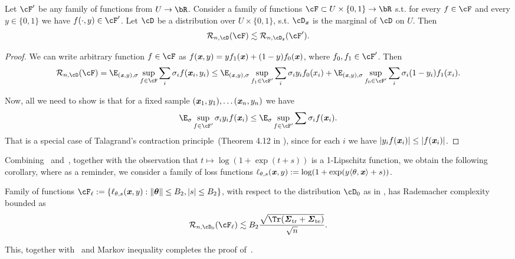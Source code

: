 \begin{lemma}
    \label{lem:rademacher-y}
    Let $\cF'$ be any family of functions from $U \to \bR$. Consider a family of functions $\cF \subset U \times \{0, 1\} \to \bR$ s.t. for every $f \in \cF$ and every $y \in \{0, 1\}$ we have $f(\cdot, y) \in \cF'$. 
    Let $\cD$ be a distribution over $U \times \{ 0, 1\}$, s.t. $\cD_{\xx}$ is the marginal of $\cD$ on $U$. Then
    \begin{equation*}
        \mathcal{R}_{n, \cD}(\cF) \lesssim \mathcal{R}_{n, \cD_{\xx}}(\cF').
    \end{equation*}
\end{lemma}
\begin{proof}
    We can write arbitrary function $f \in \cF$ as  $f(\boldsymbol{\mathit{x}}, y) = y f_1(\boldsymbol{\mathit{x}}) + (1-y) f_0(\boldsymbol{\mathit{x}})$, 
    where $f_0, f_1 \in \cF'$. Then
    \begin{equation*}
        \mathcal{R}_{n, \cD}(\cF) = \E_{(\xx, y), \sigma} \sup_{f \in \cF} \sum_i \sigma_i f(\xx_i, y_i) \leq \E_{(\xx, y), \sigma} \sup_{f_1 \in \cF'} \sum_i \sigma_i y_i f_0(x_i) + \E_{(\xx, y), \sigma}\sup_{f_0 \in \cF'} \sum_i \sigma_i (1-y_i) f_1(x_i).
    \end{equation*}

    Now, all we need to show is that for a fixed sample $(\boldsymbol{\mathit{x}}_1, y_1), \ldots (\boldsymbol{\mathit{x}}_n, y_n)$ we have
    \begin{equation*}
        \E_{\sigma} \sup_{f \in \cF'} \sigma_i y_i f(\xx_i) \leq \E_{\sigma} \sup_{f \in \cF'} \sum \sigma_i f(\xx_i).
    \end{equation*}
    That is a special case of Talagrand's contraction principle~(Theorem 4.12 in \cite{ledoux2013probability}), since for each $i$ we have $|y_i f(\boldsymbol{\mathit{x}}_i)| \leq |f(\boldsymbol{\mathit{x}}_i)|$.
\end{proof}
Combining~ and~, together with the observation that $t \mapsto \log(1 + \exp(t + s))$ is a 1-Lipschitz function, we obtain the following corollary, where as a reminder, we consider a family of loss functions $\ell_{\theta, s}(\boldsymbol{\mathit{x}}, y) := \log (1 + \exp(y\langle \theta, \boldsymbol{\mathit{x}}\rangle + s))$.
\begin{corollary}
Family of functions $\cF_{\ell} := \{\ell_{\theta, s}(\xx, y) : \|\boldsymbol{\theta}\| \leq B_2, |s| \leq B_2 \}$, with respect to the distribution $\cD_0$ as in , has Rademacher complexity bounded as
\begin{equation*}
    \mathcal{R}_{n, \cD_0}(\cF_{\ell}) \lesssim B_2 \frac{\sqrt{\Tr (\str + \ste)}}{\sqrt{n}}.
\end{equation*}
\end{corollary}

This, together with~ and Markov inequality completes the proof of~.



